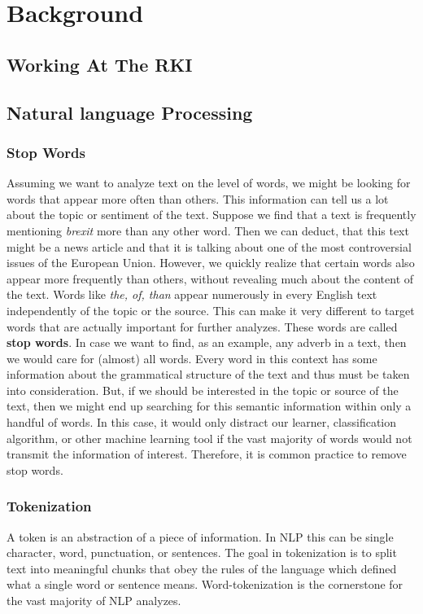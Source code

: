 \chapter{Background}

\section{Working At The RKI}

\section{Natural language Processing}


\subsection{Stop Words}
Assuming we want to analyze text on the level of words, we might be looking for
words that appear more often than others. This information can tell us a lot about
the topic or sentiment of the text. Suppose we find that a text is frequently
mentioning \textit{brexit} more than any other word. Then we can deduct, that this text might
be a news article and that it is talking about one of the most controversial issues
of the European Union. However, we quickly realize that certain words
also appear more frequently than others, without revealing much about the content
of the text. Words like \textit{the, of, than} appear numerously in every English
text independently of the topic or the source. This can make it very different to target
words that are actually important for further analyzes. These words are called \textbf{stop words}. 
In case we want to find, as an example, any adverb in a text, then we would care for (almost) all words.
Every word in this context has some information about the grammatical structure of the text
and thus must be taken into consideration. But, if we should be interested in the topic
or source of the text, then we might end up searching for this semantic information within only a handful of words.
In this case, it would only distract our learner, classification algorithm, or other machine
learning tool if the vast majority of words would not transmit the information
of interest. Therefore, it is common practice to remove stop words.


\subsection{Tokenization}
A token is an abstraction of a piece of information. In NLP this can be
single character, word, punctuation, or sentences. The goal in tokenization is
to split text into meaningful chunks that obey the rules of the language which defined
what a single word or sentence means. Word-tokenization is the cornerstone for the vast majority of NLP analyzes.

